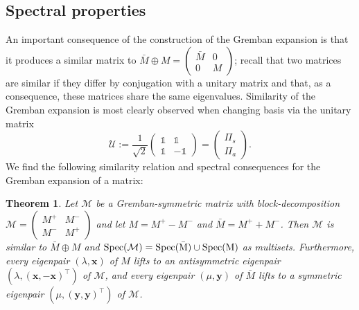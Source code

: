 \documentclass[reprint,onecolumn]{article}
\newtheorem{theorem}{Theorem}[section]
\newcommand{\1}{\mathbb{1}}
\newcommand{\0}{\mathbf{0}}
\begin{document}
\subsection{Spectral properties}
An important consequence of the construction of the Gremban expansion is that it produces a similar matrix to $\bar{M}\oplus M=\left(\begin{smallmatrix}
\bar{M}&0\\0&M
\end{smallmatrix}\right)$; recall that two matrices are similar if they differ by conjugation with a unitary matrix and that, as a consequence, these matrices share the same eigenvalues. Similarity of the Gremban expansion is most clearly observed when changing basis via the unitary matrix
\begin{equation}\label{eq:change_of_basis}
\mathcal{U} := \frac{1}{\sqrt{2}}\begin{pmatrix}
\1 & \1\\\1&-\1
\end{pmatrix} = \begin{pmatrix}
\Pi_s\\\Pi_a
\end{pmatrix}.
\end{equation}
We find the following similarity relation and spectral consequences for the Gremban expansion of a matrix:
\begin{theorem}\label{thm: spectral properties of Gremban symmetric matrix}
Let $\mathcal{M}$ be a Gremban-symmetric matrix with block-decomposition $\mathcal{M}=\left(\begin{smallmatrix}
M^+&M^-\\M^-&M^+
\end{smallmatrix}\right)$ and let $M=M^+-M^-$ and $\bar{M}=M^++M^-$. Then $\mathcal{M}$ is similar to $\bar{M}\oplus M$ and $\rm{Spec}(\mathcal{M})=\rm{Spec}(\bar{M})\cup\rm{Spec}(M)$ as multisets. Furthermore, every eigenpair $(\lambda,\mathbf{x})$ of $M$ lifts to an antisymmetric eigenpair $(\lambda, (\mathbf{x},-\mathbf{x})^\top)$ of $\mathcal{M}$, and every eigenpair $(\mu,\mathbf{y})$ of $\bar{M}$ lifts to a symmetric eigenpair $(\mu,(\mathbf{y},\mathbf{y})^\top)$ of $\mathcal{M}$. 
\end{theorem}
\end{document}
